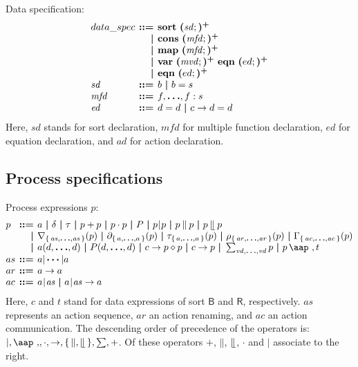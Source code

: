 \documentclass[a4paper,fleqn,10pt]{article}
\makeatletter
\newcommand{\f}[1]{\ensuremath{\mathit{#1}}}
\newcommand{\sbool}{\ensuremath{\mathsf{B}}}
\newcommand{\sreal}{\ensuremath{\mathsf{R}}}
\newenvironment{tightarray}[1]
  {\setlength{\arraycolsep}{2pt}%
   \begin{array}{@{}#1@{}}%
  }
  {\end{array}%
  }
\newcommand{\set}[1]{\ensuremath{\{\,#1\,\}}}
\newcommand{\seq}{\mathbin{\cdot}}
\newcommand{\alt}{\mathbin{+}}
\newcommand{\pmerge}{\mathbin{\parallel}}
\newcommand{\lmerge}{\mathbin{\llfloor}}
\newcommand{\sync}{\mathbin{\!\mid\!}}
\newcommand{\block}[1]{\partial_{#1}}
\newcommand{\hide}[1]{\tau_{#1}}
\newcommand{\ren}[1]{\rho_{#1}}
\newcommand{\allow}[1]{\nabla_{#1}}
\newcommand{\comm}[1]{\Gamma_{#1}}
\newcommand{\at}[1]{\mbox{\aap ,} #1}
\newcommand{\mb}[1]{\text{\boldmath$#1$}}
\newcommand{\kwsort}{{\bf sort}}
\newcommand{\kwcons}{{\bf cons}}
\newcommand{\kwmap}{{\bf map}}
\newcommand{\kwvar}{{\bf var}}
\newcommand{\kweqn}{{\bf eqn}}
\makeatother
\begin{document}
Data specification:
\[\begin{tightarray}{lrl}
data\_spec
& \mb{::=} & \kwsort\ \mb{(}\f{sd};\mb{)^{+}}\\
& \mb{|}   & \kwcons\ \mb{(}\f{mfd};\mb{)^{+}}\\
& \mb{|}   & \kwmap\  \mb{(}\f{mfd};\mb{)^{+}}\\
& \mb{|}   & \kwvar\  \mb{(}\f{mvd};\mb{)^{+}}\ \kweqn\ \mb{(}ed;\mb{)^{+}}\\
& \mb{|}   & \kweqn\  \mb{(}ed;\mb{)^{+}}\\
\f{sd}  & \mb{::=} & b\ \mb{|}\ b = s\\
\f{mfd} & \mb{::=} & f, \mb{\ldots}, f: s\\
\f{ed}  & \mb{::=} & d = d\ \mb{|}\ c \to d = d\\
\end{tightarray}\]
Here, $\f{sd}$ stands for sort declaration,
$\f{mfd}$ for multiple function declaration,
$\f{ed}$ for equation declaration,
and $\f{ad}$ for action declaration.

\subsection{Process specifications}

Process expressions $p$:
\[\begin{tightarray}{lrl}
p   & \mb{::=} & a\ \mb{|}\ \delta\ \mb{|}\ \tau\ \mb{|}\ p \alt p\ \mb{|}\ p \seq p\ \mb{|}\ P\ \mb{|}\ 
            p \sync p\ \mb{|}\ p \pmerge p\ \mb{|}\ p \lmerge p\\
    & \mb{|} & \allow{\set{\f{as},\mb{\ldots},\f{as}}}(p)\ \mb{|}\ 
            \block{\set{a,\mb{\ldots},a}}(p)\ \mb{|}\ 
            \hide{\set{a,\mb{\ldots},a}}(p)\ \mb{|}\ 
            \ren{\set{\f{ar},\mb{\ldots},\f{ar}}}(p)\ \mb{|}\ 
            \comm{\set{\f{ac},\mb{\ldots},\f{ac}}}(p)\\
    & \mb{|} & a(d, \mb{\ldots}, d)\ \mb{|}\ 
            P(d, \mb{\ldots}, d)\ \mb{|}\ 
            c \to p \diamond p\ \mb{|}\ 
            c \to p\ \mb{|}\  
            \sum_{\f{vd},\mb{\ldots},\f{vd}}p\ \mb{|}\ 
            p\,\at\,t\\ 
as  & \mb{::=} & a |\,\mb{\cdots} | a\\
ar  & \mb{::=} & a \to a\\
ac  & \mb{::=} & a\sync\f{as}\ \mb{|}\ a\sync\f{as} \to a\\
\end{tightarray}\]
Here, $c$ and $t$ stand for data expressions of sort $\sbool$ and $\sreal$,
respectively. $\f{as}$ represents an action sequence, $\f{ar}$ an action
renaming, and $\f{ac}$ an action communication. The descending order of
precedence of the operators is: $\mid, \at, \seq, \to,
\set{\pmerge,\lmerge},\sum,\alt$. Of these operators $\alt$, $\pmerge$,
$\lmerge$, $\seq$ and $\mid$ associate to the right.
\end{document}
